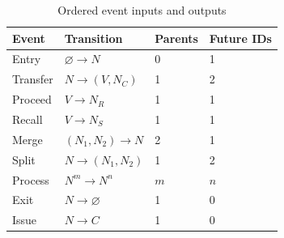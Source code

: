 \begin{table}[htbp]\centering\small
    \setcounter{table}{2}\caption{Ordered event inputs and outputs}
    \begin{tabularx}{\linewidth}{@{}XXXX@{}}\toprule
        \textbf{Event} & \textbf{Transition} & \textbf{Parents} & \textbf{Future IDs} \\ \midrule
        Entry          & $\varnothing\to N$  & 0                & 1                   \\
        Transfer       & $N\to(V,N_C)$       & 1                & 2                   \\
        Proceed        & $V\to N_R$          & 1                & 1                   \\
        Recall         & $V\to N_S$          & 1                & 1                   \\
        Merge          & $(N_1,N_2)\to N$    & 2                & 1                   \\
        Split          & $N\to(N_1,N_2)$     & 1                & 2                   \\
        Process        & $N^m\to N^n$        & $m$              & $n$                 \\
        Exit           & $N\to\varnothing$   & 1                & 0                   \\
        Issue          & $N\to C$            & 1                & 0                   \\
        \bottomrule\end{tabularx}\end{table}
